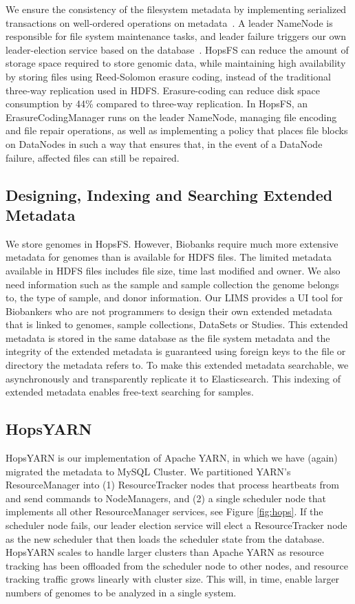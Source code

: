 We ensure the consistency of the filesystem metadata by implementing serialized transactions on well-ordered operations on metadata~\cite{hops_consistency}. A leader NameNode is responsible for file system maintenance tasks,  and leader failure triggers our own leader-election service based on the database~\cite{hopselection}. 
HopsFS can reduce the amount of storage space required to store genomic data, while maintaining high availability by storing files using Reed-Solomon erasure coding, instead of the traditional three-way replication  used in HDFS. Erasure-coding can reduce disk space consumption by 44\% compared to three-way replication. In HopsFS, an ErasureCodingManager runs on the  leader NameNode, managing file encoding and file repair operations, as well as implementing a policy that places file blocks on DataNodes in such a way that ensures that, in the event of a DataNode failure, affected files can still be repaired.

\subsection*{Designing, Indexing and Searching Extended Metadata}
We store genomes in HopsFS. However, Biobanks require much more extensive metadata for genomes than is available for HDFS files. The limited metadata available in HDFS files includes file size, time last modified and owner. We also need information such as the sample and sample collection the genome belongs to, the type of sample, and donor information. Our LIMS provides a UI tool for Biobankers who are not programmers to design their own  extended metadata that is linked  to genomes, sample collections, DataSets or Studies. This extended metadata is stored in the same database as the file system metadata and the integrity of the extended metadata is guaranteed using foreign keys to the file or directory the metadata refers to.
To make this extended metadata searchable, we asynchronously and transparently replicate it to Elasticsearch. This indexing of extended metadata enables free-text searching for samples.


\subsection*{HopsYARN}
HopsYARN is our implementation of Apache YARN, in which we have (again) migrated the metadata to MySQL Cluster. We partitioned YARN's ResourceManager into (1) ResourceTracker nodes that process heartbeats from and send commands to NodeManagers, and (2) a single scheduler node that implements all other ResourceManager services, see Figure \ref{fig:hops}. If the scheduler node fails, our leader election service will elect a ResourceTracker node as the new scheduler that then loads the scheduler state from the database. HopsYARN scales to handle larger clusters than Apache YARN as resource tracking has been offloaded from the scheduler node to other nodes, and resource tracking traffic grows linearly with cluster size. This will, in time, enable larger numbers of genomes to be analyzed in a single system.

